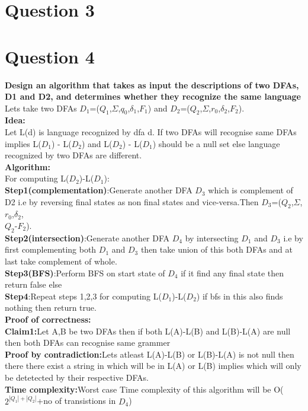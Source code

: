 \documentclass{article}
\begin{document}
\pagebreak
\section{Question 3}





\pagebreak
\section{Question 4}
\textbf{Design an algorithm that takes as input the descriptions of two DFAs, D1 and D2, and
determines whether they recognize the same language}\\

Lets take two DFAs $D_1$=($Q_1$,$\Sigma$,$q_0$,$\delta_1$,$F_1$) and $D_2$=($Q_2$,$\Sigma$,$r_0$,$\delta_2$,$F_2$).\\
\textbf{Idea:}\\
Let L(d) is language recognized by dfa d.
If two DFAs will recognise same DFAs implies L($D_1$) - L($D_2$) and L($D_2$) - L($D_1$) should be a null set else language recognized by two DFAs are different.\\
\textbf{Algorithm:}\\
For computing L($D_2$)-L($D_1$):\\
\textbf{Step1(complementation)}:Generate another DFA $D_3$ which is complement of D2 i.e by reversing final states as non final states and vice-versa.Then $D_3$=($Q_2$,$\Sigma$,$r_0$,$\delta_2$,\\$Q_2$-$F_2$).\\
\textbf{Step2(intersection)}:Generate another DFA $D_4$ by intersecting $D_1$ and $D_3$ i.e by first complementing both $D_1$ and $D_3$ then take union of this both DFAs and at last take complement of whole.\\
\textbf{Step3(BFS)}:Perform BFS on start state of $D_4$ if it find any final state then return false else \\
\textbf{Step4}:Repeat steps 1,2,3 for computing L($D_1$)-L($D_2$) if bfs in this also finds nothing then return true.\\
\textbf{Proof of correctness:}\\
\textbf{Claim1:}Let A,B be two DFAs then if both L(A)-L(B) and L(B)-L(A) are null then both DFAs can recognise same grammer\\
\textbf{Proof by contradiction:}Lets atleast L(A)-L(B) or L(B)-L(A) is not null then there there exist a string in which will be in L(A) or L(B) implies which will only be detetected by their respective DFAs.\\
\textbf{Time complexity:}Worst case Time complexity of this algorithm will be O($2^{|Q_1|+|Q_2|}$+no of transistions in $D_4$)
\end{document}
